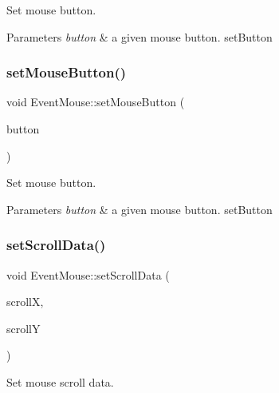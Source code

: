 Set mouse button.


\begin{DoxyParams}{Parameters}
{\em button} & a given mouse button.  set\+Button \\
\hline
\end{DoxyParams}
\mbox{\label{classEventMouse_a0e4f2ae870b9c3ac31df4efc66725751}} 
\subsubsection{\texorpdfstring{set\+Mouse\+Button()}{setMouseButton()}\hspace{0.1cm}{\footnotesize\ttfamily [2/2]}}
{\footnotesize\ttfamily void Event\+Mouse\+::set\+Mouse\+Button (\begin{DoxyParamCaption}\item[{Mouse\+Button}]{button }\end{DoxyParamCaption})\hspace{0.3cm}{\ttfamily [inline]}}

Set mouse button.


\begin{DoxyParams}{Parameters}
{\em button} & a given mouse button.  set\+Button \\
\hline
\end{DoxyParams}
\mbox{\label{classEventMouse_a8fb8c094794f11764abac87bb336e2a7}} 
\subsubsection{\texorpdfstring{set\+Scroll\+Data()}{setScrollData()}\hspace{0.1cm}{\footnotesize\ttfamily [1/2]}}
{\footnotesize\ttfamily void Event\+Mouse\+::set\+Scroll\+Data (\begin{DoxyParamCaption}\item[{float}]{scrollX,  }\item[{float}]{scrollY }\end{DoxyParamCaption})\hspace{0.3cm}{\ttfamily [inline]}}

Set mouse scroll data.


